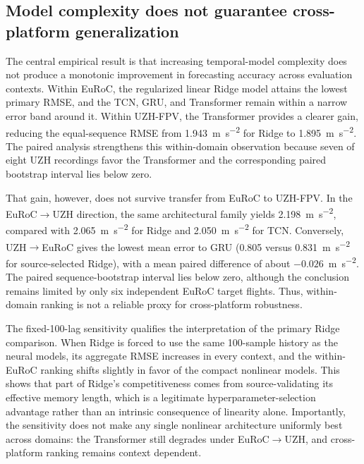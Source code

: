 \documentclass[preprint,12pt]{elsarticle}
\begin{document}
\subsection{Model complexity does not guarantee cross-platform generalization}

The central empirical result is that increasing temporal-model complexity does not produce a monotonic improvement in forecasting accuracy across evaluation contexts. Within EuRoC, the regularized linear Ridge model attains the lowest primary RMSE, and the TCN, GRU, and Transformer remain within a narrow error band around it. Within UZH-FPV, the Transformer provides a clearer gain, reducing the equal-sequence RMSE from \SI{1.943}{\metre\per\second\squared} for Ridge to \SI{1.895}{\metre\per\second\squared}. The paired analysis strengthens this within-domain observation because seven of eight UZH recordings favor the Transformer and the corresponding paired bootstrap interval lies below zero.

That gain, however, does not survive transfer from EuRoC to UZH-FPV. In the EuRoC$\rightarrow$UZH direction, the same architectural family yields \SI{2.198}{\metre\per\second\squared}, compared with \SI{2.065}{\metre\per\second\squared} for Ridge and \SI{2.050}{\metre\per\second\squared} for TCN. Conversely, UZH$\rightarrow$EuRoC gives the lowest mean error to GRU (0.805 versus 0.831~\si{\metre\per\second\squared} for source-selected Ridge), with a mean paired difference of about $-0.026$~\si{\metre\per\second\squared}. The paired sequence-bootstrap interval lies below zero, although the conclusion remains limited by only six independent EuRoC target flights. Thus, within-domain ranking is not a reliable proxy for cross-platform robustness.

The fixed-100-lag sensitivity qualifies the interpretation of the primary Ridge comparison. When Ridge is forced to use the same 100-sample history as the neural models, its aggregate RMSE increases in every context, and the within-EuRoC ranking shifts slightly in favor of the compact nonlinear models. This shows that part of Ridge's competitiveness comes from source-validating its effective memory length, which is a legitimate hyperparameter-selection advantage rather than an intrinsic consequence of linearity alone. Importantly, the sensitivity does not make any single nonlinear architecture uniformly best across domains: the Transformer still degrades under EuRoC$\rightarrow$UZH, and cross-platform ranking remains context dependent.
\end{document}
